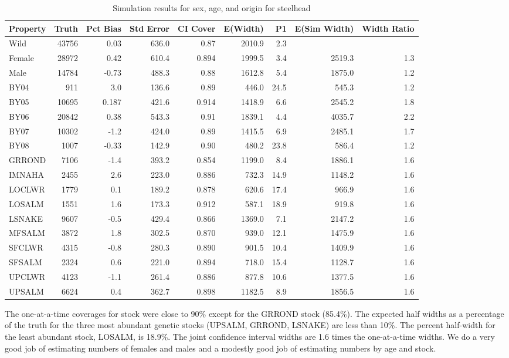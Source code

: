 \documentclass[12pt]{article}
\begin{document}
\begin{table} %
\caption{Simulation results for sex, age, and origin for steelhead}
\label{table:SHsimresults}
\footnotesize
\begin{tabular}{ | l | r | r | r | r | r | r | r | r | }
\hline
Property&Truth&Pct Bias&Std Error&CI Cover&E(Width)&P1&E(Sim Width)&Width Ratio \\ \hline
Wild&43756&0.03&636.0&0.87&2010.9&2.3&& \\ \hline
Female&28972&0.42&610.4&0.894&1999.5&3.4&2519.3&1.3 \\ \hline
Male&14784&-0.73&488.3&0.88&1612.8&5.4&1875.0&1.2 \\ \hline
BY04&911&3.0&136.6&0.89&446.0&24.5&545.3&1.2 \\ \hline
BY05&10695&0.187&421.6&0.914&1418.9&6.6&2545.2&1.8 \\ \hline
BY06&20842&0.38&543.3&0.91&1839.1&4.4&4035.7&2.2 \\ \hline
BY07&10302&-1.2&424.0&0.89&1415.5&6.9&2485.1&1.7 \\ \hline
BY08&1007&-0.33&142.9&0.90&480.2&23.8&586.4&1.2 \\ \hline
GRROND&7106&-1.4&393.2&0.854&1199.0&8.4&1886.1&1.6 \\ \hline
IMNAHA&2455&2.6&223.0&0.886&732.3&14.9&1148.2&1.6 \\ \hline
LOCLWR&1779&0.1&189.2&0.878&620.6&17.4&966.9&1.6 \\ \hline
LOSALM&1551&1.6&173.3&0.912&587.1&18.9&919.8&1.6 \\ \hline
LSNAKE&9607&-0.5&429.4&0.866&1369.0&7.1&2147.2&1.6 \\ \hline
MFSALM&3872&1.8&302.5&0.870&939.0&12.1&1475.9&1.6 \\ \hline
SFCLWR&4315&-0.8&280.3&0.890&901.5&10.4&1409.9&1.6 \\ \hline
SFSALM&2324&0.6&221.0&0.894&718.0&15.4&1128.7&1.6 \\ \hline
UPCLWR&4123&-1.1&261.4&0.886&877.8&10.6&1377.5&1.6 \\ \hline
UPSALM&6624&0.4&362.7&0.898&1182.5&8.9&1856.5&1.6 \\ \hline
\end{tabular}
\end{table}

The one-at-a-time coverages for stock were close to 90\% except for the GRROND stock (85.4\%). The expected half widths as a percentage of the truth for the three most abundant genetic stocks (UPSALM, GRROND, LSNAKE) are less than 10\%. The percent half-width for the least abundant stock, LOSALM, is 18.9\%.  The joint confidence interval widths are 1.6 times the one-at-a-time widths.  We do a very good job of estimating numbers of females and males and a modestly good job of estimating numbers by age and stock.
\end{document}
